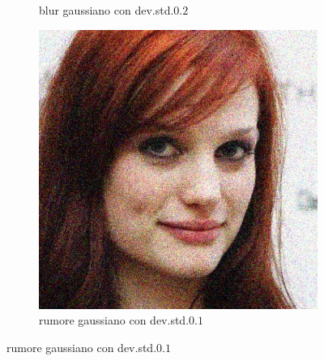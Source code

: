 \begin{figure}[ht]
\begin{subfigure}[t]{0.18\textwidth}
\caption{blur gaussiano con dev.\@ std.\@ $0.2$}
\label{sfig:corruption_gaussian_blur}
\end{subfigure}\hfill
\begin{subfigure}[t]{0.18\textwidth}
\includegraphics[width=\textwidth]{./Images/gaussian_noise_severity_0.1.jpg}
\caption{rumore gaussiano con dev.\@ std.\@ $0.1$}
\label{sfig:corruption_gaussian_noise}
\end{subfigure}\hfill


\end{figure}

